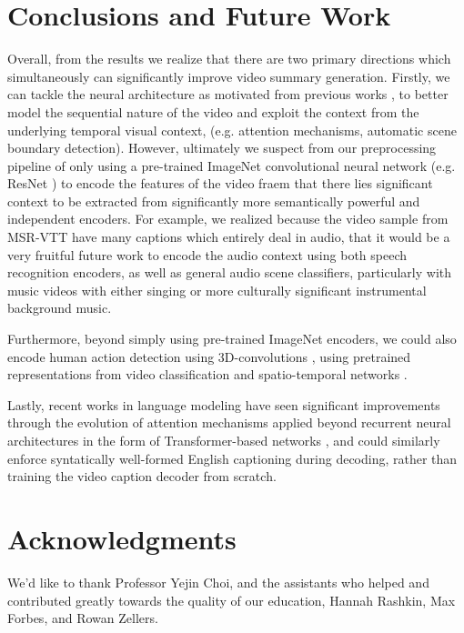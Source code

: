 \documentclass[11pt,a4paper]{article}
\begin{document}
\section{Conclusions and Future Work}

Overall, from the results we realize that there are two primary directions which simultaneously can significantly improve video summary generation. Firstly, we can tackle the neural architecture as motivated from previous works \citet{DBLP:journals/corr/BaraldiGC16b, 6c13e0e7819f435599f2cc315c48d790, DBLP:journals/corr/PanXYWZ15}, to better model the sequential nature of the video and exploit the context from the underlying temporal visual context, (e.g. attention mechanisms, automatic scene boundary detection). However, ultimately we suspect from our preprocessing pipeline of only using a pre-trained ImageNet \citet{imagenet_cvpr09} convolutional neural network (e.g. ResNet \citet{DBLP:journals/corr/HeZRS15}) to encode the features of the video fraem that there lies significant context to be extracted from significantly more semantically powerful and independent encoders. For example, we realized because the video sample from MSR-VTT have many captions which entirely deal in audio, that it would be a very fruitful future work to encode the audio context using both speech recognition encoders, as well as general audio scene classifiers, particularly with music videos with either singing or more culturally significant instrumental background music. 

Furthermore, beyond simply using pre-trained ImageNet encoders, we could also encode human action detection using 3D-convolutions \cite{Tran:2015:LSF:2919332.2919929}, using pretrained representations from video classification and spatio-temporal networks \citet{DBLP:journals/corr/abs-1711-10305, KarpathyCVPR14}. 

Lastly, recent works in language modeling have seen significant improvements through the evolution of attention mechanisms applied beyond recurrent neural architectures in the form of Transformer-based networks \citet{DBLP:journals/corr/abs-1810-04805, anonymous2019improving}, and could similarly enforce syntatically well-formed English captioning during decoding, rather than training the video caption decoder from scratch.

\section*{Acknowledgments}

We'd like to thank Professor Yejin Choi, and the assistants who helped and contributed greatly towards the quality of our education, Hannah Rashkin, Max Forbes, and Rowan Zellers.



\end{document}
